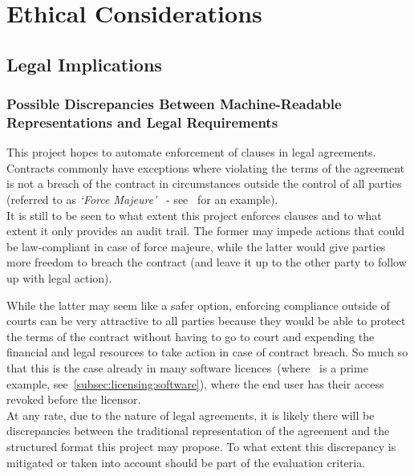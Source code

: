 
\chapter{Ethical Considerations}\label{ch:ethical}


\section{Legal Implications}\label{sec:legal-implications}

\subsection{Possible Discrepancies Between Machine-Readable Representations and Legal Requirements}
\label{subsec:legal-discrepancies}

This project hopes to automate enforcement of clauses in legal agreements.
Contracts commonly have exceptions where violating the terms of the agreement is not a breach of the
contract in circumstances outside the control of all parties (referred to as \textit{`Force
Majeure'}~\cite{forceMajeureDefinition} - see~\cite[]{jetbrainsEduLicence} for an
example).\\

It is still to be seen to what extent this project enforces clauses and to what extent it only
provides an audit trail.
The former may impede actions that could be law-compliant in case of force majeure, while the latter
would give parties more freedom to breach the contract (and leave it up to the other party to follow
up with legal action).

While the latter may seem like a safer option, enforcing compliance outside of courts can be very
attractive to all parties because they would be able to protect the terms of the contract without
having to go to court and expending the financial and legal resources to take action in case of
contract breach.
So much so that this is the case already in many software licences~(where~\cite{jetbrainsEduLicence}
is a prime example, see~\ref{subsec:licensing:software}), where the end user has their access
revoked before the licensor.\\

At any rate, due to the nature of legal agreements, it is likely there will be discrepancies
between the traditional representation of the agreement and the structured format this project
may propose.
To what extent this discrepancy is mitigated or taken into account should be part of the
evaluation criteria.

